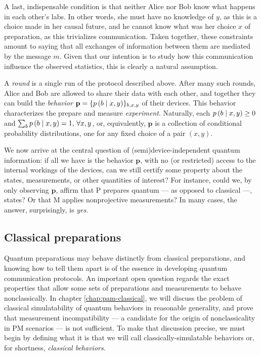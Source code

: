         A last, indispensable condition is that neither Alice nor Bob know what happens in each other's labs. In other words, she must have no knowledge of $y$, as this is a choice made in her causal future, and he cannot know what was her choice $x$ of preparation, as this trivializes communication. Taken together, these constraints amount to saying that all exchanges of information between them are mediated by the message $m$. Given that our intention is to study how this communication influence the observed statistics, this is clearly a natural assumption.
        
        A \emph{round} is a single run of the protocol described above. After many such rounds, Alice and Bob are allowed to share their data with each other, and together they can build the \emph{behavior} $\mathbf{p} = \{ p \left( b \mid x,y \right) \}_{b,x,y}$ of their devices. This behavior characterizes the prepare and measure \emph{experiment}. Naturally, each $p \left( b \mid x,y \right) \geq 0$ and $\sum_b p \left( b \mid x,y \right) = 1, \,\forall x,y$, or, equivalently, $\mathbf{p}$ is a collection of conditional probability distributions, one for any fixed choice of a pair $(x,y)$.
        
        We now arrive at the central question of (semi)device-independent quantum information: if all we have is the behavior $\mathbf{p}$, with no (or restricted) access to the internal workings of the devices, can we still certify some property about the states, measurements, or other quantities of interest? For instance, could we, by only observing $\mathbf{p}$, affirm that P prepares quantum --- as opposed to classical ---, states? Or that M applies nonprojective measurements? In many cases, the answer, surprisingly, is \emph{yes}.
    
        \subsection{Classical preparations}
        \label{sec:classical-behaviors}

            Quantum preparations may behave distinctly from classical preparations, and knowing how to tell them apart is of the essence in developing quantum communication protocols. An important open question regards the exact properties that allow some sets of preparations and measurements to behave nonclassically. In chapter \ref{chap:pam-classical}, we will discuss the problem of classical simulatability of quantum behaviors in reasonable generality, and prove that measurement incompatibility --- a candidate for the origin of nonclassicality in PM scenarios --- is not sufficient. To make that discussion precise, we must begin by defining what it is that we will call classically-simulatable behaviors or, for shortness, \emph{classical behaviors}.
        
